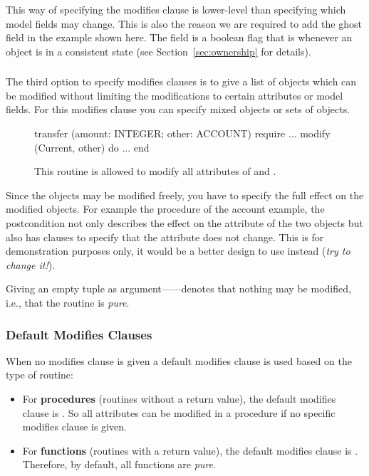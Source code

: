 This way of specifying the modifies clause is lower-level than specifying which model fields may change. This is also the reason we are required to add the ghost field  in the example shown here. The  field is a boolean flag that is  whenever an object is in a consistent state (see Section~\ref{sec:ownership} for details).

\subsubsection*{}

The third option to specify modifies clauses is to give a list of objects which can be modified without limiting the modifications to certain attributes or model fields. For this modifies clause you can specify mixed objects or sets of objects.

\begin{figure}
\begin{erunning}
transfer (amount: INTEGER; other: ACCOUNT)
	require
		...
		modify (Current, other)
	do ... end
\end{erunning}
\hspace{0.5cm}
\caption*{This routine is allowed to modify all attributes of  and .}
\end{figure}

Since the objects may be modified freely, you have to specify the full effect on the modified objects. For example the  procedure of the account example, the postcondition not only describes the effect on the  attribute of the two objects but also has clauses to specify that the  attribute does not change. This is for demonstration purposes only, it would be a better design to use  instead (\emph{try to change it!}).

Giving an empty tuple as argument------denotes that nothing may be modified, i.e., that the routine is \emph{pure}.

\subsubsection*{Default Modifies Clauses}

When no modifies clause is given a default modifies clause is used based on the type of routine:
\begin{itemize}
\item For \textbf{procedures} (routines without a return value), the default modifies clause is . So all attributes can be modified in a procedure if no specific modifies clause is given.
\item For \textbf{functions} (routines with a return value), the default modifies clause is . Therefore, by default, all functions are \emph{pure}.
\end{itemize}

